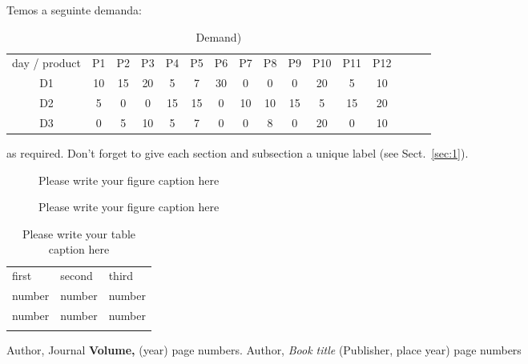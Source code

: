 Temos a seguinte demanda:
\begin{table}[h!]
\begin{center}
\footnotesize
	\begin{tabular}{ c c c c c c c c c c c c c c c c } 
	day / product & P1 & P2 & P3 & P4 & P5 & P6 & P7 & P8 & P9 & P10 & P11 & P12\\
	D1 & 10 & 15 & 20 & 5 & 7 & 30 & 0 & 0 & 0 & 20 & 5 & 10  \\
	D2 & 5 & 0 & 0 & 15 & 15 & 0 & 10 & 10 & 15 & 5 & 15 & 20 \\
	D3 & 0 & 5 & 10 & 5 & 7 & 0 & 0 & 8 & 0 & 20 & 0 & 10 \\
	\end{tabular}
\caption{Demand)}
\label{tab:symbols}
\end{center}
\end{table}

as required. Don't forget to give each section
and subsection a unique label (see Sect.~\ref{sec:1}).
%
\begin{figure}
\caption{Please write your figure caption here}
\label{fig:1}       %
\end{figure}
%
\begin{figure*}
\vspace*{5cm}       %
\caption{Please write your figure caption here}
\label{fig:2}       %
\end{figure*}
%
\begin{table}
\caption{Please write your table caption here}
\label{tab:1}       %
\begin{tabular}{lll}
\hline\noalign{\smallskip}
first & second & third  \\
\noalign{\smallskip}\hline\noalign{\smallskip}
number & number & number \\
number & number & number \\
\noalign{\smallskip}\hline
\end{tabular}
\vspace*{5cm}  %
\end{table}
%
% 
% 
%
\begin{thebibliography}{}
%
%
Author, Journal \textbf{Volume,} (year) page numbers.
Author, \textit{Book title} (Publisher, place year) page numbers
\end{thebibliography}





